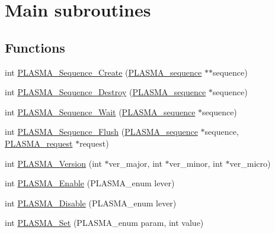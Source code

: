 \hypertarget{group__Auxiliary}{}\section{Main subroutines}
\label{group__Auxiliary}
\subsection*{Functions}
\begin{DoxyCompactItemize}
\item 
int \hyperlink{group__Auxiliary_ga3d0acf192aba8abb1e05516dff5576d1_ga3d0acf192aba8abb1e05516dff5576d1}{P\+L\+A\+S\+M\+A\+\_\+\+Sequence\+\_\+\+Create} (\hyperlink{structplasma__sequence__t}{P\+L\+A\+S\+M\+A\+\_\+sequence} $\ast$$\ast$sequence)
\item 
int \hyperlink{group__Auxiliary_ga379b74c65d498512e17ebd53691c136c_ga379b74c65d498512e17ebd53691c136c}{P\+L\+A\+S\+M\+A\+\_\+\+Sequence\+\_\+\+Destroy} (\hyperlink{structplasma__sequence__t}{P\+L\+A\+S\+M\+A\+\_\+sequence} $\ast$sequence)
\item 
int \hyperlink{group__Auxiliary_ga9335e5e704f61196b26f1236bc30c6fe_ga9335e5e704f61196b26f1236bc30c6fe}{P\+L\+A\+S\+M\+A\+\_\+\+Sequence\+\_\+\+Wait} (\hyperlink{structplasma__sequence__t}{P\+L\+A\+S\+M\+A\+\_\+sequence} $\ast$sequence)
\item 
int \hyperlink{group__Auxiliary_ga07692a955debc215044c969c01948d4c_ga07692a955debc215044c969c01948d4c}{P\+L\+A\+S\+M\+A\+\_\+\+Sequence\+\_\+\+Flush} (\hyperlink{structplasma__sequence__t}{P\+L\+A\+S\+M\+A\+\_\+sequence} $\ast$sequence, \hyperlink{structplasma__request__t}{P\+L\+A\+S\+M\+A\+\_\+request} $\ast$request)
\item 
int \hyperlink{group__Auxiliary_ga1c33868dad636574717d15ec1a4fa230_ga1c33868dad636574717d15ec1a4fa230}{P\+L\+A\+S\+M\+A\+\_\+\+Version} (int $\ast$ver\+\_\+major, int $\ast$ver\+\_\+minor, int $\ast$ver\+\_\+micro)
\item 
int \hyperlink{group__Auxiliary_gac35d2b5998d24ac69c3599213381e029_gac35d2b5998d24ac69c3599213381e029}{P\+L\+A\+S\+M\+A\+\_\+\+Enable} (P\+L\+A\+S\+M\+A\+\_\+enum lever)
\item 
int \hyperlink{group__Auxiliary_gaa99677bdc2df71e116f788fd260a8a03_gaa99677bdc2df71e116f788fd260a8a03}{P\+L\+A\+S\+M\+A\+\_\+\+Disable} (P\+L\+A\+S\+M\+A\+\_\+enum lever)
\item 
int \hyperlink{group__Auxiliary_gaf1f24ed94744b27f61987204b8779de2_gaf1f24ed94744b27f61987204b8779de2}{P\+L\+A\+S\+M\+A\+\_\+\+Set} (P\+L\+A\+S\+M\+A\+\_\+enum param, int value)
$$
\end{DoxyCompactItemize}
